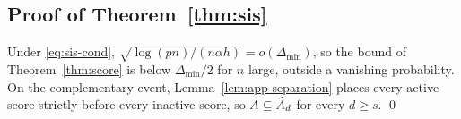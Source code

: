 \subsection{Proof of Theorem~\ref{thm:sis}}

Under \eqref{eq:sis-cond},
$\sqrt{\log(pn)/(n\alpha h)}=o(\Delta_{\min})$, so the bound of
Theorem~\ref{thm:score} is below $\Delta_{\min}/2$ for $n$ large,
outside a vanishing probability.  On the complementary event,
Lemma~\ref{lem:app-separation} places every active score strictly before
every inactive score, so $A\subseteq\widehat{A}_d$ for every $d\ge s$.  \qed
